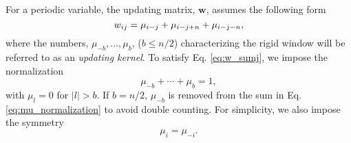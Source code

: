 \documentclass[reprint, superscriptaddress, floatfix]{revtex4-1}
\begin{document}






For a periodic variable\cite{dama2014},
the updating matrix, $\mathbf w$,
assumes the following form
%
\begin{equation}
  w_{ij}
  =
  \mu_{i-j}
  +
  \mu_{i-j+n}
  +
  \mu_{i-j-n}
  ,
\notag
\end{equation}
%
where the numbers,
$\mu_{-b}, \dots, \mu_b$, ($b \le n/2$)
characterizing the rigid window
will be referred to as an \emph{updating kernel}\cite{bussi2006}.
%
To satisfy Eq. \eqref{eq:w_sumj},
we impose the normalization
%
\begin{equation}
  \mu_{-b} + \cdots + \mu_b = 1
  ,
\label{eq:mu_normalization}
\end{equation}
%
with $\mu_l = 0$ for $|l| > b$.
%
If $b = n/2$, $\mu_{-b}$ is removed
from the sum in Eq. \eqref{eq:mu_normalization}
to avoid double counting.
%
For simplicity, we also impose the symmetry
%
\begin{equation}
  \mu_i = \mu_{-i}
  .
\label{eq:mu_symm}
\end{equation}
\end{document}
